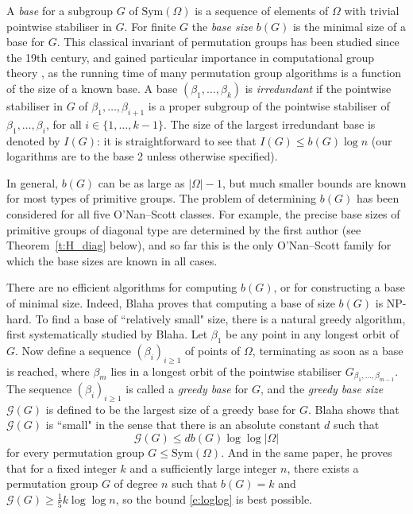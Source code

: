\documentclass[twoside,a4paper,reqno,11pt]{amsart}
\renewcommand{\b}{\beta}
\newcommand{\<}{\langle}
\renewcommand{\>}{\rangle}
\newcommand{\leqs}{\leqslant}
\def\Sym{\mathrm{Sym}}
\theoremstyle{definition}
\begin{document}
A \textit{base} for a subgroup $G$ of $\Sym(\Omega)$ is a sequence of elements of $\Omega$ with trivial pointwise stabiliser in $G$. For finite $G$ the \textit{base size} $b(G)$ is the minimal size of a base for $G$. This classical invariant of permutation groups has been studied since the 19th century, and gained particular importance in computational group theory \cite{S_compu}, as the running time of many permutation group algorithms is a function of the size of a known base. A base $(\b_1, \ldots, \b_k)$ is \emph{irredundant} if the pointwise stabiliser in $G$ of $\b_1, \ldots, \b_{i+1}$ is a proper subgroup of the pointwise stabiliser of $\b_1, \ldots, \b_i$, for all $i \in \{1, \ldots, k-1\}$. The size of the largest irredundant base is denoted by $I(G)$: it is straightforward to see that $I(G) \leqs b(G) \log n$ (our logarithms are to the base 2 unless otherwise specified). 

In general, $b(G)$ can be as large as $|\Omega| -1$, but much smaller bounds are known for most types of primitive groups.  The problem of determining $b(G)$ has been considered for all five O'Nan--Scott classes. For example, the precise base sizes of primitive groups of diagonal type are determined by the first author \cite{H_diag} (see Theorem~\ref{t:H_diag} below), and so far this is the only O'Nan--Scott family for which the base sizes are known in all cases. 

There are no efficient algorithms
for computing $b(G)$, or  for constructing a base of minimal size. Indeed, Blaha \cite{Blaha} proves that computing a base of size $b(G)$ is NP-hard. To find a base of ``relatively small" size, 
there is a natural greedy algorithm, first systematically studied by Blaha. Let $\beta_1$ be any point in any longest orbit of $G$. Now define a sequence $(\b_i)_{i\geqslant 1}$ of points of  $\Omega$, terminating as soon as a base is reached, where $\b_m$ lies in a longest orbit of the pointwise stabiliser $G_{\b_1, \ldots, \b_{m-1}}$.
The sequence $(\b_i)_{i\geqslant 1}$ is called a \textit{greedy base} for $G$, and the \textit{greedy base size} $\mathcal{G}(G)$ is defined to be the largest size of a greedy base for $G$. Blaha \cite{Blaha} shows that $\mathcal{G}(G)$ is ``small" in the sense that there is an absolute constant $d$ such that
\begin{equation}\label{e:loglog}
    \mathcal{G}(G)\leqslant db(G)\log\log|\Omega|
\end{equation}
for every permutation group $G\leqslant\mathrm{Sym}(\Omega)$. And in the same paper, he proves that for a fixed integer $k$ and a sufficiently large integer $n$, there exists a permutation group $G$ of degree $n$ such that $b(G) = k$ and $\mathcal{G}(G) \geqslant \frac{1}{5}k\log\log n$, so the bound \eqref{e:loglog} is best possible. 
\end{document}
